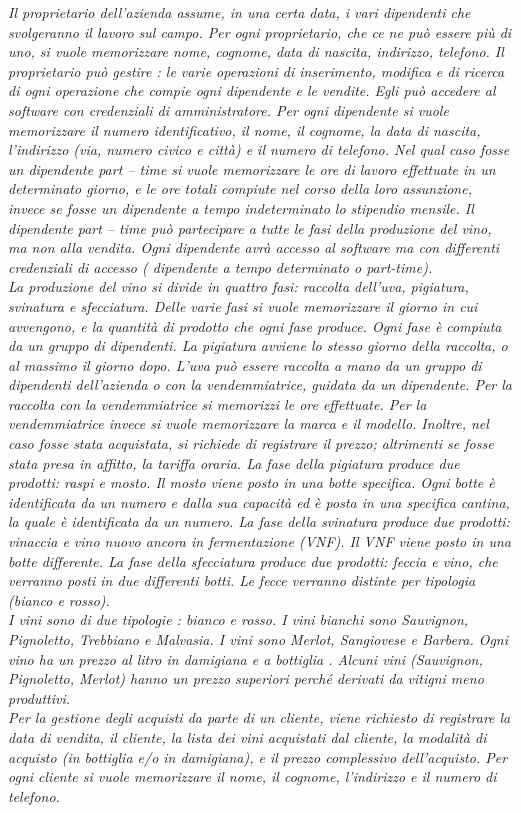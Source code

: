 \documentclass{article}
\begin{document}
\textit{Il proprietario dell'azienda assume, in una certa data, i vari dipendenti che svolgeranno il lavoro sul campo. Per ogni proprietario, che ce ne può essere più di uno, si vuole memorizzare nome, cognome, data di nascita, indirizzo, telefono.
Il proprietario può gestire : le varie operazioni di inserimento, modifica e di ricerca di ogni operazione che compie ogni dipendente e le vendite. Egli può accedere al software con credenziali di amministratore.
Per ogni dipendente si vuole memorizzare il numero identificativo, il nome, il cognome, la data di nascita, l'indirizzo (via, numero civico e città) e il numero di telefono.
Nel qual caso fosse un dipendente part – time si vuole memorizzare le ore di lavoro effettuate in un determinato giorno, e le ore totali compiute nel corso della loro assunzione, invece se fosse un dipendente a tempo indeterminato lo stipendio mensile.
Il dipendente part – time può partecipare a tutte le fasi della produzione del vino, ma non alla vendita.
Ogni dipendente avrà accesso al software ma con differenti credenziali di accesso ( dipendente a tempo determinato o part-time).\\
La produzione del vino si divide in quattro fasi: raccolta dell'uva, pigiatura, svinatura e sfecciatura.
Delle varie fasi si vuole memorizzare il giorno in cui avvengono, e la quantità di prodotto che ogni fase produce. Ogni fase è compiuta da un gruppo di dipendenti. La pigiatura avviene lo stesso giorno della raccolta, o al massimo il giorno dopo.
L’uva può essere raccolta a mano da un gruppo di dipendenti dell'azienda o con la vendemmiatrice, guidata da un dipendente.
Per la raccolta con la vendemmiatrice si memorizzi le ore effettuate.
Per  la vendemmiatrice invece si vuole memorizzare la marca e il modello. Inoltre, nel caso fosse stata acquistata, si richiede di registrare il prezzo; altrimenti se fosse stata presa in affitto, la tariffa oraria.
La fase della pigiatura produce due prodotti: raspi e mosto. Il mosto viene posto in una botte specifica.
Ogni botte è identificata da un numero e dalla sua capacità ed è posta in una specifica cantina, la quale è identificata da un numero.
La fase della svinatura produce due prodotti: vinaccia e vino nuovo ancora in fermentazione (VNF). Il VNF viene posto in una botte differente. 
La fase della sfecciatura produce due prodotti: feccia e vino, che verranno posti in due differenti botti. Le fecce verranno distinte per tipologia (bianco e rosso).\\
I vini sono di due tipologie : bianco e rosso. I vini bianchi sono Sauvignon, Pignoletto, Trebbiano e Malvasia. I vini sono Merlot, Sangiovese e Barbera.
Ogni vino ha un prezzo al litro in damigiana e a bottiglia .
Alcuni vini (Sauvignon, Pignoletto, Merlot) hanno un prezzo superiori perché derivati da vitigni meno produttivi.\\
Per la gestione degli acquisti da parte di un cliente, viene richiesto di registrare la data di vendita, il cliente, la lista dei vini acquistati dal cliente, la modalità di acquisto (in bottiglia e/o in damigiana), e il prezzo complessivo dell'acquisto. Per ogni cliente si vuole memorizzare il nome, il cognome, l'indirizzo e il numero di telefono.}
\end{document}
